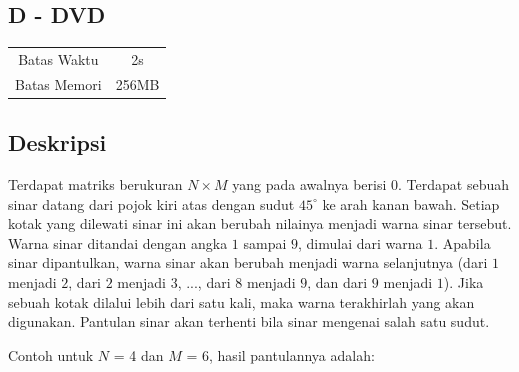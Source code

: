 \documentclass{article}
\begin{document}
\begin{center}
    \section*{D - DVD} %

    \begin{tabular}{ | c c | }
        \hline
        Batas Waktu  & 2s \\    %
        Batas Memori & 256MB \\  %
        \hline
    \end{tabular}
\end{center}

\subsection*{Deskripsi}

Terdapat matriks berukuran $N \times M$ yang pada awalnya berisi $0$. Terdapat sebuah sinar datang dari pojok kiri atas dengan sudut $45^{\circ}$ ke arah kanan bawah. Setiap kotak yang dilewati sinar ini akan berubah nilainya menjadi warna sinar tersebut. Warna sinar ditandai dengan angka $1$ sampai $9$, dimulai dari warna $1$. Apabila sinar dipantulkan, warna sinar akan berubah menjadi warna selanjutnya (dari $1$ menjadi $2$, dari $2$ menjadi $3$, ..., dari $8$ menjadi $9$, dan dari $9$ menjadi $1$). Jika sebuah kotak dilalui lebih dari satu kali, maka warna terakhirlah yang akan digunakan. Pantulan sinar akan terhenti bila sinar mengenai salah satu sudut.

Contoh untuk $N$ = 4 dan $M$ = 6, hasil pantulannya adalah:

\begin{center}
\end{center}
\end{document}
